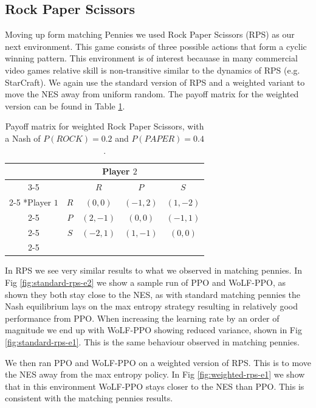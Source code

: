 \documentclass[conference]{IEEEtran}
\begin{document}
\subsection{Rock Paper Scissors}

Moving up form matching Pennies we used Rock Paper Scissors (RPS) as our next environment. This game consists of three possible actions that form a cyclic winning pattern. This environment is of interest becauase in many commercial video games relative skill is non-transitive similar to the dynamics of RPS (e.g. StarCraft\cite{balduzzi2019open}). We again use the standard version of RPS and a weighted variant to move the NES away from uniform random. The payoff matrix for the weighted version can be found in Table \ref{tab:weighted-rps}.

\begin{table}[!ht]
    \centering
    \setlength{\extrarowheight}{2pt}
    \begin{tabular}{*{5}{c|}}
      \multicolumn{2}{c}{} & \multicolumn{2}{c}{Player $2$}\\\cline{3-5}
      \multicolumn{1}{c}{} &  & $R$  & $P$ & $S$ \\\cline{2-5}
      \multirow{2}*{Player $1$}  & $R$ & $(0,0)$ & $(-1,2)$ & $(1,-2)$ \\\cline{2-5}
      & $P$ & $(2,-1)$ & $(0,0)$ & $(-1,1)$ \\\cline{2-5}
      & $S$ & $(-2,1)$ & $(1,-1)$ & $(0,0)$ \\\cline{2-5}
    \end{tabular}
    \caption{Payoff matrix for weighted Rock Paper Scissors, with a Nash of $P(ROCK)=0.2$ and $P(PAPER)=0.4$.}
    \label{tab:weighted-rps}
\end{table}


In RPS we see very similar results to what we observed in matching pennies. In Fig \ref{fig:standard-rps-e2} we show a sample run of PPO and WoLF-PPO, as shown they both stay close to the NES, as with standard matching pennies the Nash equilibrium lays on the max entropy strategy resulting in relatively good performance from PPO. When increasing the learning rate by an order of magnitude we end up with WoLF-PPO showing reduced variance, shown in Fig \ref{fig:standard-rps-e1}. This is the same behaviour observed in matching pennies.

We then ran PPO and WoLF-PPO on a weighted version of RPS. This is to move the NES away from the max entropy policy. In Fig \ref{fig:weighted-rps-e1} we show that in this environment WoLF-PPO stays closer to the NES than PPO. This is consistent with the matching pennies results.
\end{document}

